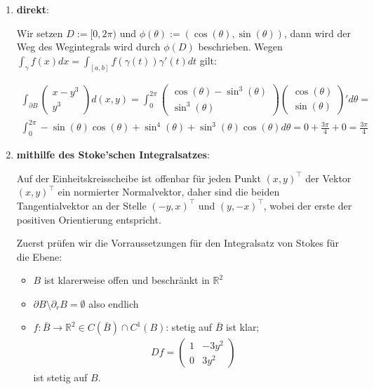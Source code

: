 \documentclass[]{article}
\begin{document}
\begin{enumerate}[label*=(\roman*)]
	\item \textbf{direkt}:
	
	Wir setzen $D:=[0,2\pi)$ und $\phi(\theta):=(\cos(\theta), \sin(\theta))$, dann wird der Weg des Wegintegrals wird durch $\phi(D)$ beschrieben. Wegen $\int_\gamma f(x) dx = \int_{[a, b]} f(\gamma(t)) \gamma'(t) dt$ gilt:
	
	\begin{align*}
		\int_{\partial B} \begin{pmatrix} x-y^3\\ y^3 \end{pmatrix} d(x,y) = \int_{0}^{2\pi} \begin{pmatrix} \cos(\theta)-\sin^3(\theta)\\ \sin^3(\theta) \end{pmatrix} \begin{pmatrix} \cos(\theta)\\ \sin(\theta) \end{pmatrix}' d\theta =\\
		\int_{0}^{2\pi} -\sin(\theta)\cos(\theta) + \sin^4(\theta) + \sin^3(\theta)\cos(\theta) d\theta = 0 + \frac{3\pi}{4} + 0 = \frac{3\pi}{4}
	\end{align*}

	\item \textbf{mithilfe des Stoke'schen Integralsatzes}:
	
	Auf der Einheitskreisscheibe ist offenbar für jeden Punkt $(x,y)^\top$ der Vektor $(x,y)^\top$ ein normierter Normalvektor, daher sind die beiden Tangentialvektor an der Stelle $(-y, x)^\top$ und $(y, -x)^\top$, wobei der erste der positiven Orientierung entspricht.
	
	Zuerst prüfen wir die Vorraussetzungen für den Integralsatz von Stokes für die Ebene:
	\begin{itemize}
		\item $B$ ist klarerweise offen und beschränkt in $\mathbb{R}^2$
		\item $\partial B \setminus \partial_r B = \emptyset$ also endlich
		\item $f:\bar{B}\rightarrow\mathbb{R}^2 \in C(\bar{B}) \cap C^1(B)$: stetig auf $\bar{B}$ ist klar;
		\begin{align*}
			Df = \begin{pmatrix} 1 & -3y^2\\ 0 & 3y^2 \end{pmatrix}
		\end{align*}
		ist stetig auf $B$.
	\end{itemize}


\end{enumerate}
\end{document}
